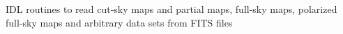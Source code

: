   \item[%
\htmlref{read\_fits\_cut4}{idl:read_fits_cut4},
\htmlref{read\_fits\_partial}{idl:read_fits_partial},
\htmlref{read\_fits\_map}{idl:read_fits_map}]
  \item[%
\htmlref{read\_tqu}{idl:read_tqu},
\htmlref{read\_fits\_s}{idl:read_fits_s}]
\healpix IDL routines to read cut-sky maps and partial maps, full-sky maps, polarized full-sky maps and
arbitrary data sets from FITS files

